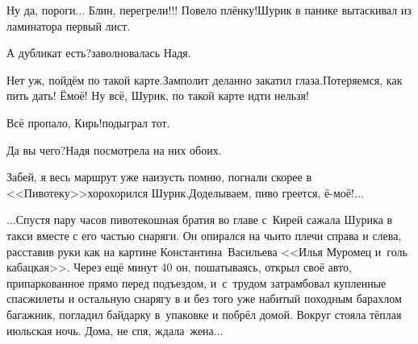 \diagdash Ну да, пороги$\ldots$ Блин, перегрели!!! Повело плёнку!\mdash Шурик в панике вытаскивал из ламинатора первый лист.%

\diagdash А дубликат есть?\mdash заволновалась Надя.

\diagdash Нет уж, пойдём по такой карте.\mdash Замполит деланно закатил глаза.\mdash Потеряемся, как пить дать! Ё\sdash моё! Ну всё, Шурик, по такой карте идти нельзя! 

\diagdash Всё пропало, Кирь!\mdash подыграл тот.

\diagdash Да вы чего?\mdash Надя посмотрела на них обоих.

\diagdash Забей, я весь маршрут уже наизусть помню, погнали скорее в <<Пивотеку>>\mdash хорохорился Шурик.\mdash Доделываем, пиво греется, ё-моё!$\ldots$

\vspace{0.5cm}
$\ldots$Спустя пару часов пивотекошная братия во главе с~Кирей сажала Шурика в такси вместе с его частью снаряги. Он опирался на чьи\sdash то плечи справа и слева, расставив руки как на картине Константина~Васильева <<Илья Муромец и~голь кабацкая>>. Через ещё минут 40 он, пошатываясь, открыл своё авто, припаркованное прямо перед подъездом, и~с~трудом затрамбовал купленные спасжилеты и остальную снарягу в и без того уже набитый походным барахлом багажник, погладил байдарку в~упаковке и побрёл домой. Вокруг стояла тёплая июльская ночь. Дома, не спя, ждала~жена$\ldots$

\begin{center}
\end{center}
